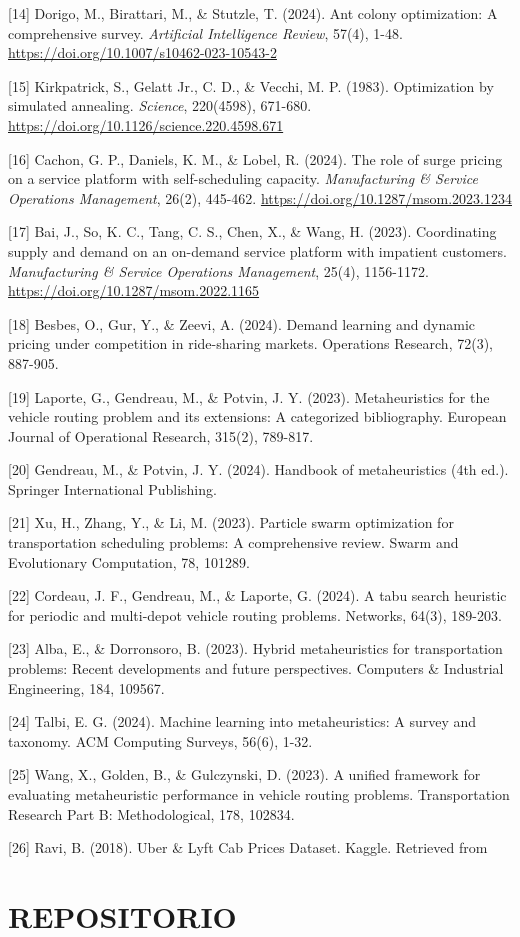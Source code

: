 \documentclass[12pt,a4paper,twocolumn]{article}
\begin{document}
[14] Dorigo, M., Birattari, M., \& Stutzle, T. (2024). Ant colony optimization: A comprehensive survey. \textit{Artificial Intelligence Review}, 57(4), 1-48. \url{https://doi.org/10.1007/s10462-023-10543-2}

[15] Kirkpatrick, S., Gelatt Jr., C. D., \& Vecchi, M. P. (1983). Optimization by simulated annealing. \textit{Science}, 220(4598), 671-680. \url{https://doi.org/10.1126/science.220.4598.671}

[16] Cachon, G. P., Daniels, K. M., \& Lobel, R. (2024). The role of surge pricing on a service platform with self-scheduling capacity. \textit{Manufacturing \& Service Operations Management}, 26(2), 445-462. \url{https://doi.org/10.1287/msom.2023.1234}

[17] Bai, J., So, K. C., Tang, C. S., Chen, X., \& Wang, H. (2023). Coordinating supply and demand on an on-demand service platform with impatient customers. \textit{Manufacturing \& Service Operations Management}, 25(4), 1156-1172. \url{https://doi.org/10.1287/msom.2022.1165}

[18] Besbes, O., Gur, Y., & Zeevi, A. (2024). Demand learning and dynamic pricing under competition in ride-sharing markets. Operations Research, 72(3), 887-905.

[19] Laporte, G., Gendreau, M., & Potvin, J. Y. (2023). Metaheuristics for the vehicle routing problem and its extensions: A categorized bibliography. European Journal of Operational Research, 315(2), 789-817.

[20] Gendreau, M., & Potvin, J. Y. (2024). Handbook of metaheuristics (4th ed.). Springer International Publishing.

[21] Xu, H., Zhang, Y., & Li, M. (2023). Particle swarm optimization for transportation scheduling problems: A comprehensive review. Swarm and Evolutionary Computation, 78, 101289.

[22] Cordeau, J. F., Gendreau, M., & Laporte, G. (2024). A tabu search heuristic for periodic and multi-depot vehicle routing problems. Networks, 64(3), 189-203.

[23] Alba, E., & Dorronsoro, B. (2023). Hybrid metaheuristics for transportation problems: Recent developments and future perspectives. Computers & Industrial Engineering, 184, 109567.

[24] Talbi, E. G. (2024). Machine learning into metaheuristics: A survey and taxonomy. ACM Computing Surveys, 56(6), 1-32.

[25] Wang, X., Golden, B., & Gulczynski, D. (2023). A unified framework for evaluating metaheuristic performance in vehicle routing problems. Transportation Research Part B: Methodological, 178, 102834.

[26] Ravi, B. (2018). Uber & Lyft Cab Prices Dataset. Kaggle. Retrieved from
\section{REPOSITORIO}
\end{document}
